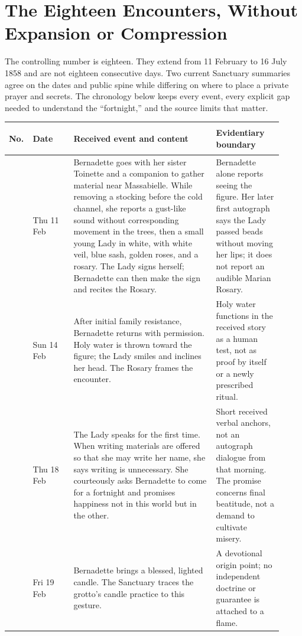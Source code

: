 \section{The Eighteen Encounters, Without Expansion or Compression}

The controlling number is eighteen. They extend from 11 February to 16 July 1858 and are not eighteen consecutive days. Two current Sanctuary summaries agree on the dates and public spine while differing on where to place a private prayer and secrets. The chronology below keeps every event, every explicit gap needed to understand the “fortnight,” and the source limits that matter.

\begingroup
\footnotesize
\setlength{\LTpre}{0pt}
\begin{longtable}{>{\bfseries\raggedright\arraybackslash}p{0.055\linewidth}>{\raggedright\arraybackslash}p{0.14\linewidth}>{\raggedright\arraybackslash}p{0.49\linewidth}>{\raggedright\arraybackslash}p{0.23\linewidth}}
\toprule
No. & Date & Received event and content & Evidentiary boundary\\
\midrule
\endhead
1 & Thu 11 Feb & Bernadette goes with her sister Toinette and a companion to gather material near Massabielle. While removing a stocking before the cold channel, she reports a gust-like sound without corresponding movement in the trees, then a small young Lady in white, with white veil, blue sash, golden roses, and a rosary. The Lady signs herself; Bernadette can then make the sign and recites the Rosary. & Bernadette alone reports seeing the figure. Her later first autograph says the Lady passed beads without moving her lips; it does not report an audible Marian Rosary.\\
2 & Sun 14 Feb & After initial family resistance, Bernadette returns with permission. Holy water is thrown toward the figure; the Lady smiles and inclines her head. The Rosary frames the encounter. & Holy water functions in the received story as a human test, not as proof by itself or a newly prescribed ritual.\\
3 & Thu 18 Feb & The Lady speaks for the first time. When writing materials are offered so that she may write her name, she says writing is unnecessary. She courteously asks Bernadette to come for a fortnight and promises happiness not in this world but in the other. & Short received verbal anchors, not an autograph dialogue from that morning. The promise concerns final beatitude, not a demand to cultivate misery.\\
4 & Fri 19 Feb & Bernadette brings a blessed, lighted candle. The Sanctuary traces the grotto's candle practice to this gesture. & A devotional origin point; no independent doctrine or guarantee is attached to a flame.\\

\end{longtable}
